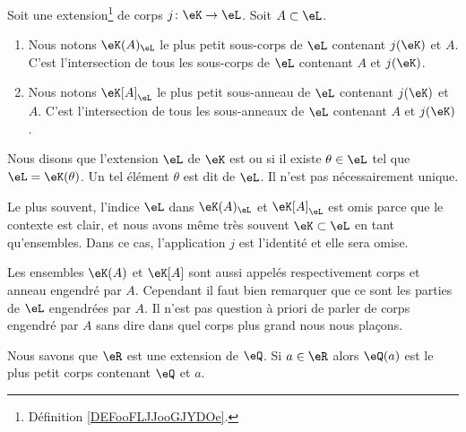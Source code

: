\begin{definition}  \label{DefZCYIbve}
	Soit une extension\footnote{Définition \ref{DEFooFLJJooGJYDOe}.} de corps \( j\colon \eK\to \eL\). Soit \( A\subset \eL\).
	\begin{enumerate}
		\item       \label{ITEMooJEGUooMsDBhF}
		      Nous notons \( \eK(A)_{\eL}\) le plus petit sous-corps de \( \eL\) contenant \( j(\eK)\) et \( A\). C'est l'intersection de tous les sous-corps de \( \eL\) contenant \( A\) et \( j(\eK)\).
		\item
		      Nous notons \( \eK[A]_{\eL}\) le plus petit sous-anneau de \( \eL\) contenant \( j(\eK)\) et \( A\). C'est l'intersection de tous les sous-anneaux de \( \eL\) contenant \( A\) et \( j(\eK)\).
	\end{enumerate}

	Nous disons que l'extension \( \eL\) de \( \eK\) est  ou  si il existe \( \theta\in\eL\) tel que \( \eL=\eK(\theta)\). Un tel élément \( \theta\) est dit  de \( \eL\). Il n'est pas nécessairement unique.
\end{definition}
Le plus souvent, l'indice \( \eL\) dans \( \eK(A)_{\eL}\) et \( \eK[A]_{\eL}\) est omis parce que le contexte est clair, et nous avons même très souvent \( \eK\subset \eL\) en tant qu'ensembles. Dans ce cas, l'application \( j\) est l'identité et elle sera omise.

\begin{remark}
	Les ensembles \( \eK(A)\) et \( \eK[A]\) sont aussi appelés respectivement corps  et anneau engendré par \( A\). Cependant il faut bien remarquer que ce sont les parties de \( \eL\) engendrées par \( A\). Il n'est pas question à priori de parler de corps engendré par \( A\) sans dire dans quel corps plus grand nous nous plaçons.
\end{remark}

\begin{example}
	Nous savons que \( \eR\) est une extension de \( \eQ\). Si \( a\in \eR\) alors \( \eQ(a)\) est le plus petit corps contenant \( \eQ\) et \( a\).
\end{example}

